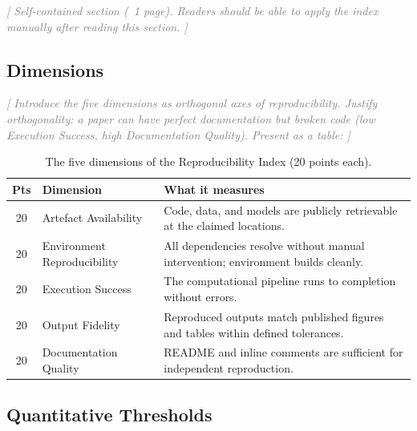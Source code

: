 \documentclass{article}
\newcommand{\outline}[1]{\textcolor{gray}{\textit{[#1]}}}
\begin{document}
\outline{%
  Self-contained section (~1 page). Readers should be able to apply the
  index manually after reading this section.
}

\subsection{Dimensions}
\label{sec:dimensions}

\outline{%
  Introduce the five dimensions as orthogonal axes of reproducibility.
  Justify orthogonality: a paper can have perfect documentation but
  broken code (low Execution Success, high Documentation Quality).
  Present as a table:
}

\begin{table}[h]
  \centering
  \caption{The five dimensions of the Reproducibility Index (20 points each).}
  \label{tab:dimensions}
  \begin{tabular}{clp{7cm}}
    \toprule
    \textbf{Pts} & \textbf{Dimension} & \textbf{What it measures} \\
    \midrule
    20 & Artefact Availability       & Code, data, and models are publicly retrievable at the claimed locations. \\
    20 & Environment Reproducibility & All dependencies resolve without manual intervention; environment builds cleanly. \\
    20 & Execution Success           & The computational pipeline runs to completion without errors. \\
    20 & Output Fidelity             & Reproduced outputs match published figures and tables within defined tolerances. \\
    20 & Documentation Quality       & README and inline comments are sufficient for independent reproduction. \\
    \bottomrule
  \end{tabular}
\end{table}

\subsection{Quantitative Thresholds}
\label{sec:thresholds}
\end{document}
